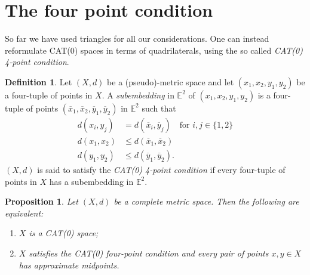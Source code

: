 \documentclass[11pt, a4paper, oneside]{memoir}
\theoremstyle{plain}\newtheorem{theorem}[subsection]{Theorem}
\newtheorem{proposition}[subsection]{Proposition}
\theoremstyle{definition}
\newtheorem{definition}[subsection]{Definition}
\newcommand{\E}{\mathbb{E}}
\begin{document}
\section{The four point condition}
So far we have used triangles for all our considerations.
One can instead reformulate CAT(0) spaces in terms of quadrilaterals, using the so called \emph{CAT(0) 4-point condition}.
\begin{definition}
Let \((X,d)\) be a (pseudo)-metric space and let \((x_1,x_2,y_1,y_2)\) be a four-tuple of points in \(X\).
A \emph{subembedding} in \(\E^2\) of \((x_1,x_2,y_1,y_2)\) is a four-tuple of points \((\overline{x}_1,\overline{x}_2,\overline{y}_1,\overline{y}_2)\) in \(\E^2\) such that
\begin{align}
    d(x_i,y_j)  &=d(\overline{x}_i,\overline{y}_j)\quad\text{for }i,j\in\{1,2\}\label{quad:dif}\\
    d(x_1,x_2)  &\leq d(\overline{x}_1,\overline{x}_2)\label{quad:x}\\
    d(y_1,y_2)  &\leq d(\overline{y}_1,\overline{y}_2)\label{quad:y}.
\end{align}
\((X,d)\) is said to satisfy the \textit{CAT(0) 4-point condition} if every four-tuple of points in \(X\) has a subembedding in \(\E^2\).
\end{definition}
\begin{proposition}
    Let \((X,d)\) be a complete metric space.
    Then the following are equivalent:
    \begin{enumerate}
        \item \(X\) is a CAT(0) space;
        \item \(X\) satisfies the CAT(0) four-point condition and every pair of points \(x,y\in X\) has approximate midpoints.
    \end{enumerate}
\end{proposition}
\end{document}
